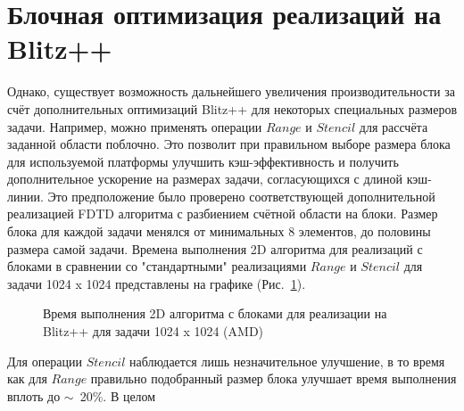 \documentclass[10pt]{article}
\begin{document}
\section{Блочная оптимизация реализаций на Blitz++}
Однако, существует возможность дальнейшего увеличения
производительности за счёт дополнительных оптимизаций Blitz++ для некоторых
специальных размеров задачи. Например, можно применять операции $Range$ и 
$Stencil$ для рассчёта заданной области поблочно. Это позволит при правильном 
выборе размера блока для используемой платформы улучшить кэш-эффективность и 
получить дополнительное ускорение на размерах задачи, согласующихся с длиной
кэш-линии. Это предположение было проверено соответствующей дополнительной 
реализацией FDTD алгоритма с разбиением счётной области на блоки. Размер блока 
для каждой задачи менялся от минимальных 8 элементов, до половины размера самой 
задачи. Времена выполнения 2D алгоритма для реализаций с блоками в сравнении со 
"стандартными" реализациями $Range$ и 
$Stencil$ для задачи 1024 x 1024 представлены на графике (Рис.~\ref{1024_amd}).
\begin{figure}[h]
\begin{minipage}[h]{1\textwidth}
\end{minipage}
\caption{Время выполнения 2D алгоритма с блоками для реализации на Blitz++ 
  для задачи 1024 x 1024 (AMD)}
\label{1024_amd}
\end{figure}
\clearpage
Для операции $Stencil$ 
наблюдается лишь незначительное улучшение, в то время как для $Range$ правильно
подобранный размер блока улучшает время выполнения вплоть до $\mathtt{\sim}$~20\%. В целом 
\end{document}
